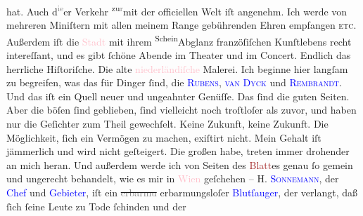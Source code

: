 \documentclass[twoside=false,titlepage=false,open=any, parskip=never, fontsize=12pt, headings=small, chapterprefix=false, appendixprefix=false]{scrbook}
\newcommand{\strikeout}[1]{\sout{#1}}
\newcommand{\Theight}{\dimexpr\fontcharht\font`W}
\newcommand{\pbposition}{\depth}
\newcommand{\pb}{\nobreak\hspace{0pt}\raisebox{-0.1em}{\raisebox{\pbposition}{\textnormal{|}}}\nobreak\hspace{0pt}}
\newcommand{\substVorne}{\textnormal{\raisebox{\Theight}{\raisebox{-\height}{\rotatebox[origin=c]{180}{v}\normalsize}}}}
\newcommand{\substDazwischen}{}
\newcommand{\substHinten}{\textnormal{\raisebox{\Theight}{\raisebox{-\height}{\small{v}\normalsize}}}}
\begin{document}
               hat. Auch d\substVorne{}\textsuperscript{\textcolor{gray}{ie}}\substDazwischen{}er\substHinten{} Verkehr \substVorne{}\textsuperscript{zu\textcolor{gray}{r}}\substDazwischen{}mit der\substHinten{} officiellen Welt iſt angenehm. Ich werde von mehreren Miniſtern mit allen
               meinem Range gebührenden Ehren empfangen \textsc{etc.} Außerdem iſt
               die \textcolor{pink}{Stadt}{} mit ihrem \substVorne{}\textsuperscript{Schein}{\allowbreak}\substDazwischen{}Abglanz\substHinten{} franzöſiſchen Kunſtlebens recht intereſſant, und es gibt ſchöne Abende im
               Theater und im Concert. Endlich das herrliche Hiſtoriſche. Die alte \textcolor{pink}{niederländiſche}{}\ledrightnote{\textcolor{pink}{Niederlande}} Malerei. Ich beginne hier langſam zu
               begreifen, was das für Dinger ſind, die \textsc{\textcolor{blue}{Rubens}{}\ledrightnote{\textcolor{blue}{Peter Paul Rubens}}}, \textsc{\textcolor{blue}{van Dyck}{}\ledrightnote{\textcolor{blue}{Anthonis van Dyck}}} und \textsc{\textcolor{blue}{Rembrandt}{}\ledrightnote{\textcolor{blue}{Rembrandt van Rijn}}}. Und das iſt ein Quell neuer und {\pb}ungeahnter
               Genüſſe.\pend
           \pstart
           Das ſind die guten Seiten. Aber die böſen ſind geblieben, ſind vielleicht noch
               troſtloſer als zuvor, und haben nur die Geſichter zum Theil gewechſelt. Keine
               Zukunft, keine Zukunft. Die Möglichkeit, ſich ein Vermögen zu machen, exiſtirt nicht.
               Mein Gehalt iſt jämmerlich und wird nicht geſteigert. Die großen \label{K_L02669-999v}\label{K_L02669-999h} habe, treten immer drohender an mich heran. Und außerdem werde ich von Seiten
               des \textcolor{brown}{Blatt}{}es genau ſo gemein und
               ungerecht behandelt, wie es mir in \textcolor{pink}{Wien}{}\ledrightnote{\textcolor{pink}{Wien}} geſchehen
               – H. \textsc{\textcolor{blue}{Sonnemann}{}\ledrightnote{\textcolor{blue}{Leopold Sonnemann}}}, der \textcolor{blue}{Chef}{} und \textcolor{blue}{Gebieter}{}, iſt ein \strikeout{\textcolor{gray}{erbarmu}} erbarmungsloſer \textcolor{blue}{Blutſauger}{}, der verlangt, daß ſich ſeine Leute zu Tode ſchinden und der
\end{document}
